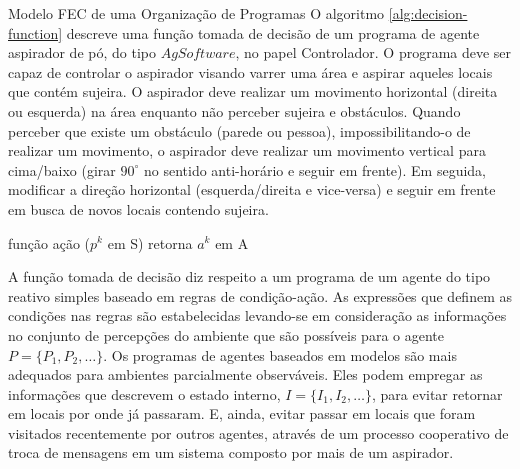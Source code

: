 \begin{section}{Modelo FEC de uma Organização de Programas}
        O algoritmo \ref{alg:decision-function} descreve uma função tomada de decisão de um programa de agente aspirador de pó, do tipo $AgSoftware$, no papel Controlador. O programa deve ser capaz de controlar o aspirador visando varrer uma área e aspirar aqueles locais que contém sujeira. O aspirador deve realizar um movimento horizontal (direita ou esquerda) na área enquanto não perceber sujeira e obstáculos. Quando perceber que existe um obstáculo (parede ou pessoa), impossibilitando-o de realizar um movimento, o aspirador deve realizar um movimento vertical para cima/baixo (girar $90^\circ$ no sentido anti-horário e seguir em frente). Em seguida, modificar a direção horizontal (esquerda/direita e vice-versa) e seguir em frente em busca de novos locais contendo sujeira.
        
        \begin{algorithm}[h!]
            \caption{\label{alg:decision-function} Descrição parcial da função tomada de decisão de um agente reativo.}
            função ação ($p^k$ em S) retorna $a^k$ em A\\
        \end{algorithm}
        
        A função tomada de decisão diz respeito a um programa de um agente do tipo reativo simples baseado em regras de condição-ação. As expressões que definem as condições nas regras são estabelecidas levando-se em consideração as informações no conjunto de percepções do ambiente que são possíveis para o agente $P = \{P_1, P_2, \ldots \}$. Os programas de agentes baseados em modelos são mais adequados para ambientes parcialmente observáveis. Eles podem empregar as informações que descrevem o estado interno, $I = \{I_1, I_2, \ldots \}$, para evitar retornar em locais por onde já passaram. E, ainda, evitar passar em locais que foram visitados recentemente por outros agentes, através de um processo cooperativo de troca de mensagens em um sistema composto por mais de um aspirador.
    

\end{section}
